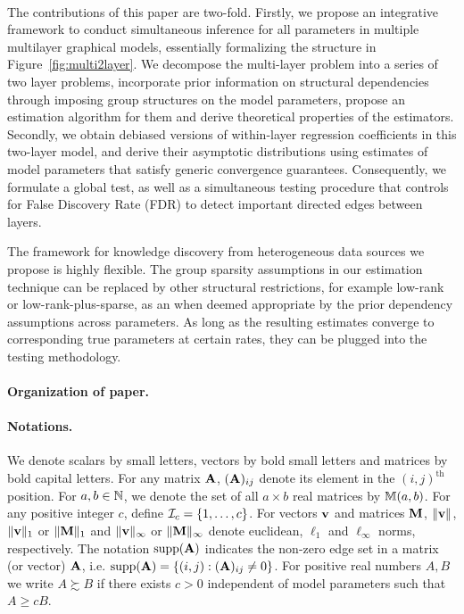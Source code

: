 \paragraph{}
The contributions of this paper are two-fold. Firstly, we propose an integrative framework to conduct simultaneous inference for all parameters in multiple multilayer graphical models, essentially formalizing the structure in Figure~\ref{fig:multi2layer}. We decompose the multi-layer problem into a series of two layer problems, incorporate prior information on structural dependencies through imposing group structures on the model parameters, propose an estimation algorithm for them and derive theoretical properties of the estimators. Secondly, we obtain debiased versions of within-layer regression coefficients in this two-layer model, and derive their asymptotic distributions using estimates of model parameters that satisfy generic convergence guarantees. Consequently, we formulate a global test, as well as a simultaneous testing procedure that controls for False Discovery Rate (FDR) to detect important directed edges between layers.

The framework for knowledge discovery from heterogeneous data sources we propose is highly flexible. The group sparsity assumptions in our estimation technique can be replaced by other structural restrictions, for example low-rank or low-rank-plus-sparse, as an when deemed appropriate by the prior dependency assumptions across parameters. As long as the resulting estimates converge to corresponding true parameters at certain rates, they can be plugged into the testing methodology.
\paragraph{Organization of paper.}

\paragraph{Notations.}
We denote scalars by small letters, vectors by bold small letters and matrices by bold capital letters. For any matrix ${\mathbf{A}}$, $({\mathbf{A}})_{ij}$ denote its element in the $(i,j)^\text{th}$ position. For $a,b \in {\mathbb{N}}$, we denote the set of all $a \times b$ real matrices by ${\mathbb{M}}(a,b)$. For any positive integer $c$, define ${\cal{I}}_c = \{ 1, \ldots, c\}$. For vectors ${\bf{v}}$ and matrices ${\mathbf{M}}$, $\| {\bf{v}} \|$, $\|{\bf{v}} \|_1$ or $\|{\mathbf{M}} \|_1$ and $\|{\bf{v}} \|_\infty$ or $\|{\mathbf{M}} \|_\infty$ denote euclidean, $\ell_1$ and $\ell_\infty$ norms, respectively. The notation $\operatorname*{supp}({\mathbf{A}})$ indicates the non-zero edge set in a matrix (or vector) ${\mathbf{A}}$, i.e. $\operatorname*{supp}({\mathbf{A}}) = \{(i,j): ({\mathbf{A}})_{ij} \neq 0\}$. For positive real numbers $A, B$ we write $A \succsim B$ if there exists $c>0$ independent of model parameters such that $A \geq cB$. 